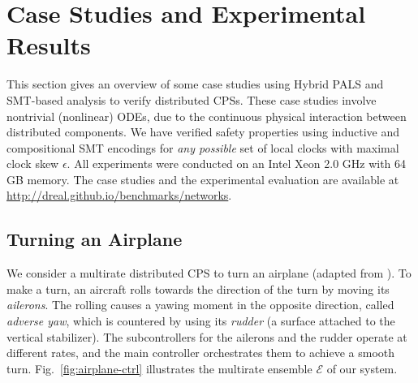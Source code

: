 
%
\section{Case Studies and Experimental Results}
\label{sec:case-studies}

This section gives an overview of some 
case studies using Hybrid PALS and SMT-based analysis to verify %
distributed CPSs. 
%
These case studies involve nontrivial (nonlinear) ODEs,
due to the  continuous physical interaction between distributed components.
We have verified safety properties 
using %
inductive and compositional SMT encodings
for \emph{any possible} set of  local clocks with maximal clock skew $\epsilon$.
%
All  experiments 
were conducted on an Intel Xeon 2.0 GHz with 64 GB memory.
The case studies and the experimental evaluation are available at %
\url{http://dreal.github.io/benchmarks/networks}. 




\subsection{Turning an Airplane}
\label{sec:ex-airplane}

We consider a multirate distributed CPS
to turn an airplane (adapted from \cite{ftscs-journal}).
%
To make a turn, an aircraft rolls towards the direction of the turn
by moving its \emph{ailerons}. %
The rolling causes 
a yawing moment in the opposite direction, called \emph{adverse yaw},
which is countered by using its \emph{rudder} (a surface attached to the vertical stabilizer).
%
The subcontrollers for the ailerons and the rudder operate at different rates, 
and the main controller orchestrates them to achieve a smooth turn.
%
Fig.~\ref{fig:airplane-ctrl} illustrates the multirate ensemble $\mathcal{E}$ of our system.


